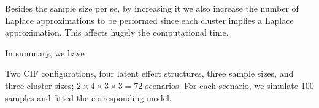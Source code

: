 Besides the sample size per se, by increasing it we also increase the
number of Laplace approximations to be performed since each cluster
implies a Laplace approximation. This affects hugely the computational
time.

In summary, we have

Two CIF configurations, four latent effect structures, three sample
sizes, and three cluster sizes; \(2 \times 4 \times 3 \times 3 = 72\)
scenarios. For each scenario, we simulate 100 samples and fitted the
corresponding model.

